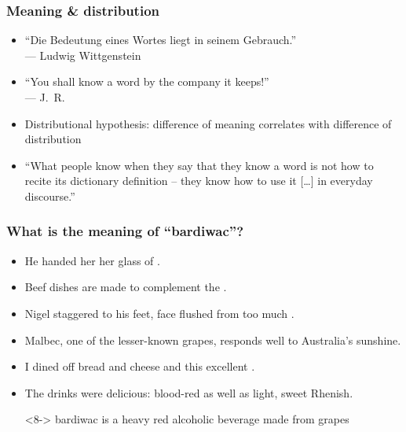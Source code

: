 \begin{frame}[c]
  \frametitle{Meaning \& distribution}

  \begin{itemize}
  \item ``Die Bedeutung eines Wortes liegt in seinem Gebrauch.''\\
    \hfill --- Ludwig Wittgenstein
  \item[]
  \item ``You shall know a word by the company it keeps!''\\
    \hfill --- J.~R.\ \citet{Firth:57}
  \item[]
  \item Distributional hypothesis: difference of meaning correlates with difference of distribution \citep[Zellig][]{Harris:54}
  \item[]
  \item ``What people know when they say that they know a word is not how to recite its dictionary definition -- they know how to use it [\ldots] in everyday discourse.'' \citep{Miller:86}
  \end{itemize}
\end{frame}

\begin{frame}
  \frametitle{What is the meaning of ``\textbf{bardiwac}''?}

  \begin{itemize}
  \item<2-> He handed her her glass of .
  \item<3-> Beef dishes are made to complement the .
  \item<4-> Nigel staggered to his feet, face flushed from too much .
  \item<5-> Malbec, one of the lesser-known  grapes, responds well to Australia's sunshine.
  \item<6-> I dined off bread and cheese and this excellent .
  \item<7-> The drinks were delicious: blood-red  as well as light, sweet Rhenish.
  \item[\hand]<8-> bardiwac is a heavy red alcoholic beverage made from grapes
  \end{itemize}

  \gap
  \begin{small}
  \end{small}
\end{frame}

